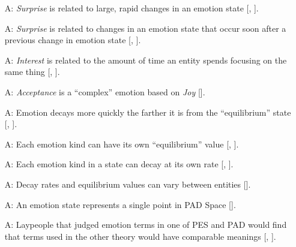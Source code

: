 \begin{itemize}
    \item[A\refstepcounter{assumpnum}\theassumpnum \label{A_Surprise}:]
    \textit{Surprise} is related to large, rapid changes in an emotion state 
    [, ].

    \item[A\refstepcounter{assumpnum}\theassumpnum \label{A_Surprise2}:]
    \textit{Surprise} is related to changes in an emotion state that occur soon 
    after a previous change in emotion state 
    [, ].

     \item[A\refstepcounter{assumpnum}\theassumpnum \label{A_Interest}:] 
     \textit{Interest} is related to the amount of time an entity spends 
     focusing on the same thing [, 
     ].

     \item[A\refstepcounter{assumpnum}\theassumpnum \label{A_Acceptance}:] 
     \textit{Acceptance} is a ``complex'' emotion based on \textit{Joy}
     [].

     \item[A\refstepcounter{assumpnum}\theassumpnum \label{A_DecaySpeed}:] 
     Emotion decays more quickly the farther it is from the ``equilibrium'' 
     state [, ].

     \item[A\refstepcounter{assumpnum}\theassumpnum \label{A_Equilibrium}:] 
     Each emotion kind can have its own ``equilibrium'' value 
     [, ].

     \item[A\refstepcounter{assumpnum}\theassumpnum \label{A_DecayRate}:] 
     Each emotion kind in a state can decay at its own rate 
     [, ].

    \item[A\refstepcounter{assumpnum}\theassumpnum \label{A_DecayUnique}:] 
    Decay rates and equilibrium values can vary between entities 
    [].

    \item[A\refstepcounter{assumpnum}\theassumpnum \label{A_OnePADPoint}:] 
    An emotion state represents a single point in PAD Space 
    [].

    \item[A\refstepcounter{assumpnum}\theassumpnum \label{A_EmotionTerms}:] 
    Laypeople that judged emotion terms in one of PES and PAD would find that 
    terms used in the other theory would have comparable meanings 
    [, ].


\end{itemize}
